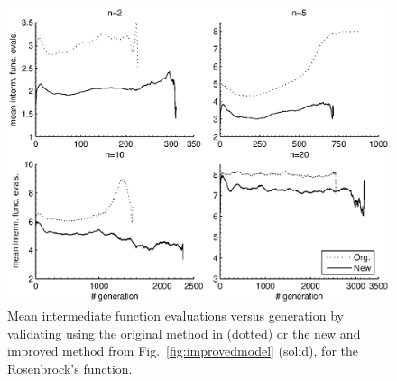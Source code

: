 \documentclass[conference]{IEEEtran}
\begin{document}
\begin{figure}[t!]
\centering
\includegraphics[trim = 15mm 10mm 15mm 5mm, clip, width=0.99\columnwidth]{figs/rosen_intmEvals_gen.eps}
\caption{Mean intermediate function evaluations versus generation by validating using the original method in \cite{Ru06:PPSN} (dotted) or the new and improved method from Fig.~\ref{fig:improvedmodel} (solid), for the Rosenbrock's function.}
\label{fig:rosenIntmEval}
\end{figure}
\end{document}
